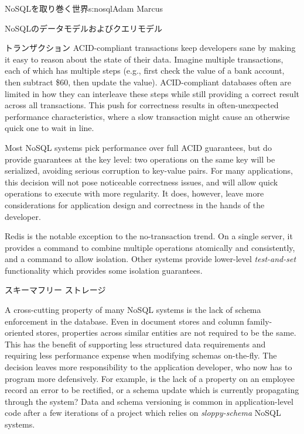 \begin{aosachapter}{NoSQLを取り巻く世界}{s:nosql}{Adam Marcus}
\begin{aosasect1}{NoSQLのデータモデルおよびクエリモデル}
\begin{aosasect2}{トランザクション}
ACID-compliant transactions keep developers sane by making it easy to
reason about the state of their data.  Imagine multiple
transactions, each of which has multiple steps (e.g., first check the
value of a bank account, then subtract \$60, then update the
value). ACID-compliant databases often are limited in how they can
interleave these steps while still providing a correct result across
all transactions.  This push for correctness results in
often-unexpected performance characteristics, where a slow transaction
might cause an otherwise quick one to wait in line.

Most NoSQL systems pick performance over full ACID guarantees, but do
provide guarantees at the key level: two operations on the same key
will be serialized, avoiding serious corruption to key-value pairs.
For many applications, this decision will not pose noticeable
correctness issues, and will allow quick operations to execute with
more regularity.  It does, however, leave more considerations for
application design and correctness in the hands of the developer.

Redis is the notable exception to the no-transaction trend.  On a
single server, it provides a  command to combine multiple
operations atomically and consistently, and a  command to
allow isolation.  Other systems provide lower-level
\emph{test-and-set} functionality which provides some isolation
guarantees.

\end{aosasect2}

\begin{aosasect2}{スキーマフリー ストレージ}

A cross-cutting property of many NoSQL systems is the lack of schema
enforcement in the database.  Even in document stores and column
family-oriented stores, properties across similar entities are not
required to be the same.  This has the benefit of supporting less
structured data requirements and requiring less performance expense
when modifying schemas on-the-fly.  The decision leaves more
responsibility to the application developer, who now has to program
more defensively.  For example, is the lack of a 
property on an employee record an error to be rectified, or a schema
update which is currently propagating through the system?  Data and
schema versioning is common in application-level code after a few
iterations of a project which relies on \emph{sloppy-schema} NoSQL
systems.


\end{aosasect2}
\end{aosasect1}
\end{aosachapter}

